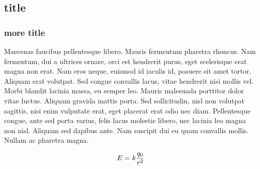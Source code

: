 \subsection{title}
\subsubsection{more title}

Maecenas faucibus pellentesque libero. Mauris fermentum pharetra rhoncus. Nam fermentum, dui a ultrices ornare, orci est hendrerit purus, eget scelerisque erat magna non erat. Nam eros neque, euismod id iaculis id, posuere sit amet tortor. Aliquam erat volutpat. Sed congue convallis lacus, vitae hendrerit nisi mollis vel. Morbi blandit lacinia massa, eu semper leo. Mauris malesuada porttitor dolor vitae luctus. Aliquam gravida mattis porta. Sed sollicitudin, nisl non volutpat sagittis, nisi enim vulputate erat, eget placerat erat odio nec diam. Pellentesque congue, ante sed porta varius, felis lacus molestie libero, nec lacinia leo magna non nisl. Aliquam sed dapibus ante. Nam suscipit dui eu quam convallis mollis. Nullam ac pharetra magna.

\begin{equation*}
	E = k \frac{q_0}{r^2} \\
\end{equation*}